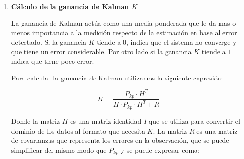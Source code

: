 \begin{enumerate}
\begin{equation}
    \hspace{-1.1cm}
    P_{kp} =
    \begin{bmatrix}
    1 & \Delta t  \\
    0 & 1         \\
    \end{bmatrix} \\
    \cdot 
    \begin{bmatrix}
    {\Delta_{px}}^2 & 0   \\
    0 & {\Delta_{pv_x}}^2 \\
    \end{bmatrix}
    \cdot
    \begin{bmatrix}
    1 & 0           \\
    \Delta t & 1    \\
    \end{bmatrix}   \\
    +
    \begin{bmatrix}
    0 & 0  \\
    0 & 0  \\
    \end{bmatrix}  \\    
\end{equation}

\item \textbf{Cálculo de la ganancia de Kalman $K$} \mbox{} \vspace{4pt}

La ganancia de Kalman actúa como una media ponderada que le da mas o menos importancia a la medición respecto de la estimación en base al error detectado. Si la ganancia $K$ tiende a $0$, indica que el sistema no converge y que tiene un error considerable. Por otro lado si la ganancia $K$ tiende a $1$ indica que tiene poco error.

Para calcular la ganancia de Kalman utilizamos la siguiente expresión:

\begin{equation}
    K = \frac{P_{kp} \cdot H^T} {H \cdot P_{kp} \cdot H^T + R}  
\end{equation}

Donde la matriz $H$ es una matriz identidad $I$ que se utiliza para convertir el dominio de los datos al formato que necesita $K$. La matriz $R$ es una matriz de covarianzas que representa los errores en la observación, que se puede simplificar del mismo modo que $P_{kp}$ y se puede expresar como:


\end{enumerate}
